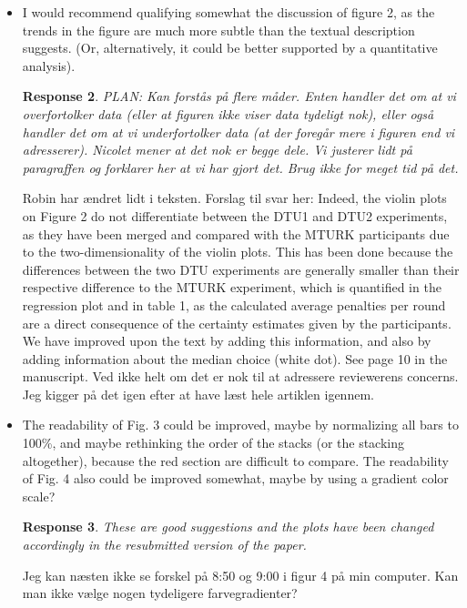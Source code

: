 \documentclass[a4paper]{article}
\newtheorem{response}{Response}
\newenvironment{robin}{\smallskip \noindent \color{red!10!green!50!blue}}{\color{black}\smallskip}
\newenvironment{tobo}{\smallskip \noindent \color{yellow!80!black!80}}{\color{black}\smallskip}
\begin{document}
\begin{itemize}
\begin{response}Yes, we intend to include more detailed comments in the scripts and codes when the paper is about to be finalized for publishing. A new R script for the mixed effects model has been included. \end{response}

\item I would recommend qualifying somewhat the discussion of figure 2, as the trends in the figure are much more subtle than the textual description suggests. (Or, alternatively, it could be better supported by a quantitative analysis).

\begin{response}
PLAN: Kan forstås på flere måder. Enten handler det om at vi overfortolker data (eller at figuren ikke viser data tydeligt nok), eller også handler det om at vi underfortolker data (at der foregår mere i figuren end vi adresserer). Nicolet mener at det nok er begge dele. Vi justerer lidt på paragraffen og forklarer her at vi har gjort det. Brug ikke for meget tid på det. 
\end{response}

\begin{robin} Robin har ændret lidt i teksten. Forslag til svar her: Indeed, the violin plots on Figure 2 do not differentiate between the DTU1 and DTU2 experiments, as they have been merged and compared with the MTURK participants due to the two-dimensionality of the violin plots. This has been done because the differences between the two DTU experiments are generally smaller than their respective difference to the MTURK experiment, which is quantified in the regression plot and in table 1, as the calculated average penalties per round are a direct consequence of the certainty estimates given by the participants. We have improved upon the text by adding this information, and also by adding information about the median choice (white dot).  See page 10 in the manuscript.
\end{robin}
\begin{tobo}
Ved ikke helt om det er nok til at adressere reviewerens concerns. Jeg kigger på det igen efter at have læst hele artiklen igennem. 
\end{tobo}

\item The readability of Fig. 3 could be improved, maybe by normalizing all bars to 100\%, and maybe rethinking the order of the stacks (or the stacking altogether), because the red section are difficult to compare. The readability of Fig. 4 also could be improved somewhat, maybe by using a gradient color scale?

\begin{response}These are good suggestions and the plots have been changed accordingly in the resubmitted version of the paper. \end{response}
\begin{tobo}
Jeg kan næsten ikke se forskel på 8:50 og 9:00 i figur 4 på min computer. Kan man ikke vælge nogen tydeligere farvegradienter?
\end{tobo}
\end{itemize}
\end{document}
